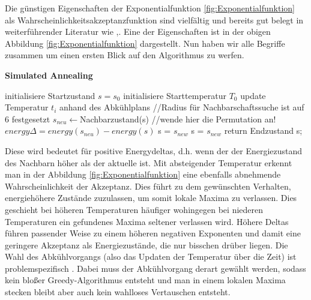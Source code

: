 Die günstigen Eigenschaften der Exponentialfunktion \ref{fig:Exponentialfunktion} als
Wahrscheinlichkeitsakzeptanzfunktion sind vielfältig und bereits gut belegt in weiterführender Literatur wie 
\cite{Kirkpatrick671},\cite{van1987simulated}. Eine der Eigenschaften ist in der obigen Abbildung 
\ref{fig:Exponentialfunktion} dargestellt.
Nun haben wir alle Begriffe zusammen um einen ersten Blick auf den Algorithmus zu werfen.

\begin{algorithm}[H]
    \caption{\textbf{Simulated Annealing}}
    \begin{algorithmic}[1]
        \State initialisiere Startzustand $s=s_{0}$
        \State initialisiere Starttemperatur $T_0$
        \State update Temperatur $t_i$ anhand des Abkühlplans
        \State //Radius für Nachbarschaftssuche ist auf 6 festgesetzt
        \State $s_{neu}\leftarrow$Nachbarzustand(s) //wende hier die Permutation an!
        \State $energy\Delta = energy(s_{neu}) - energy(s)$
        \State s = $s_{new}$
        \Else{}
        \State s = $s_{new}$
        \EndIf
        \EndIf
        \EndFor
        \State return Endzustand s;
    \end{algorithmic}
    \label{alg:retargeting}
\end{algorithm}

Diese wird bedeutet für positive Energydeltas, d.h. wenn der der Energiezustand
des Nachbarn höher als der aktuelle ist. Mit absteigender Temperatur erkennt man 
in der Abbildung \ref{fig:Exponentialfunktion} eine ebenfalls abnehmende Wahrscheinlichkeit
der Akzeptanz. Dies führt zu dem gewünschten Verhalten, energiehöhere Zustände 
zuzulassen, um somit lokale Maxima zu verlassen. Dies geschieht bei höheren 
Temperaturen häufiger wohingegen bei niederen Temperaturen ein gefundenes Maxima
seltener verlassen wird. Höhere Deltas führen passender Weise zu einem höheren negativen 
Exponenten und damit eine geringere Akzeptanz als Energiezustände, die nur bisschen 
drüber liegen. Die Wahl des Abkühlvorgangs (also das Updaten der Temperatur über die Zeit)
ist problemspezifisch \cite[S. 9]{Kirkpatrick671}. Dabei muss der Abkühlvorgang derart
gewählt werden, sodass kein bloßer Greedy-Algorithmus entsteht und man in einem lokalen 
Maxima stecken bleibt aber auch kein wahlloses Vertauschen entsteht.

